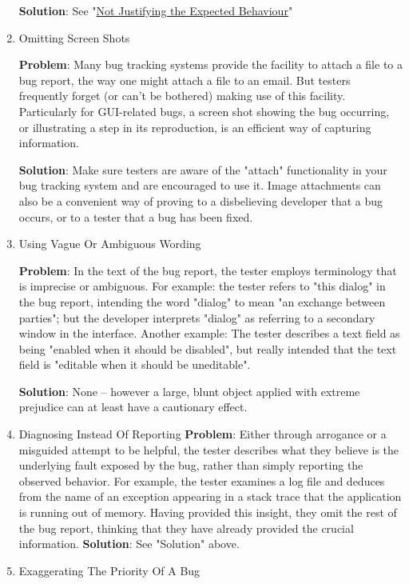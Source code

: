 \documentclass{article}
\begin{document}
\begin{enumerate}
\textbf{Solution}: See "\hyperref[sec:orgheadline93]{Not Justifying the Expected Behaviour}"

\item Omitting Screen Shots
\label{sec:orgheadline98}

\textbf{Problem}: Many bug tracking systems provide the facility to attach a
file to a bug report, the way one might attach a file to an email. But
testers frequently forget (or can't be bothered) making use of this
facility. Particularly for GUI-related bugs, a screen shot showing the
bug occurring, or illustrating a step in its reproduction, is an
efficient way of capturing information.

\textbf{Solution}: Make sure testers are aware of the "attach" functionality in
your bug tracking system and are encouraged to use it. Image attachments
can also be a convenient way of proving to a disbelieving developer that
a bug occurs, or to a tester that a bug has been fixed.

\item Using Vague Or Ambiguous Wording
\label{sec:orgheadline99}

\textbf{Problem}: In the text of the bug report, the tester employs terminology
that is imprecise or ambiguous. For example: the tester refers to "this
dialog" in the bug report, intending the word "dialog" to mean "an
exchange between parties"; but the developer interprets "dialog" as
referring to a secondary window in the interface. Another example: The
tester describes a text field as being "enabled when it should be
disabled", but really intended that the text field is "editable when it
should be uneditable".

\textbf{Solution}: None -- however a large, blunt object applied with extreme
prejudice can at least have a cautionary effect.

\item Diagnosing Instead Of Reporting
\label{sec:orgheadline94}
\textbf{Problem}: Either through arrogance or a misguided attempt to be
helpful, the tester describes what they believe is the underlying fault
exposed by the bug, rather than simply reporting the observed behavior.
For example, the tester examines a log file and deduces from the name of
an exception appearing in a stack trace that the application is running
out of memory. Having provided this insight, they omit the rest of the
bug report, thinking that they have already provided the crucial
information. \textbf{Solution}: See "Solution" above.

\item Exaggerating The Priority Of A Bug
\label{sec:orgheadline100}


\end{enumerate}
\end{document}
